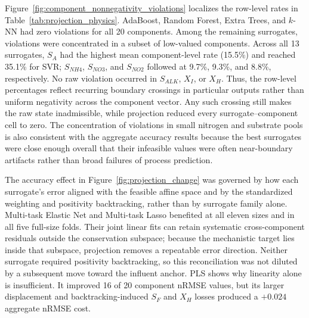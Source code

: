 \documentclass[a4paper,fleqn]{cas-sc}
\begin{document}
Figure~\ref{fig:component_nonnegativity_violations} localizes the row-level rates in Table~\ref{tab:projection_physics}. AdaBoost, Random Forest, Extra Trees, and $k$-NN had zero violations for all 20 components. Among the remaining surrogates, violations were concentrated in a subset of low-valued components. Across all 13 surrogates, $S_A$ had the highest mean component-level rate (15.5\%) and reached 35.1\% for SVR; $S_{NH4}$, $S_{NO3}$, and $S_{NO2}$ followed at 9.7\%, 9.3\%, and 8.8\%, respectively. No raw violation occurred in $S_{ALK}$, $X_I$, or $X_H$. Thus, the row-level percentages reflect recurring boundary crossings in particular outputs rather than uniform negativity across the component vector. Any such crossing still makes the raw state inadmissible, while projection reduced every surrogate--component cell to zero. The concentration of violations in small nitrogen and substrate pools is also consistent with the aggregate accuracy results because the best surrogates were close enough overall that their infeasible values were often near-boundary artifacts rather than broad failures of process prediction.

The accuracy effect in Figure~\ref{fig:projection_change} was governed by how each surrogate's error aligned with the feasible affine space and by the standardized weighting and positivity backtracking, rather than by surrogate family alone. Multi-task Elastic Net and Multi-task Lasso benefited at all eleven sizes and in all five full-size folds. Their joint linear fits can retain systematic cross-component residuals outside the conservation subspace; because the mechanistic target lies inside that subspace, projection removes a repeatable error direction. Neither surrogate required positivity backtracking, so this reconciliation was not diluted by a subsequent move toward the influent anchor. PLS shows why linearity alone is insufficient. It improved 16 of 20 component nRMSE values, but its larger displacement and backtracking-induced $S_F$ and $X_H$ losses produced a $+0.024$ aggregate nRMSE cost.
\end{document}
